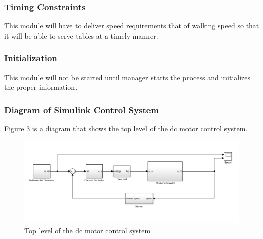 \documentclass [10pt]{article}
\begin{document}
\subsubsection{Timing Constraints}
This module will have to deliver speed requirements that of walking speed so that it will be able to serve tables at a timely manner.


\subsubsection{Initialization}
This module will not be started until manager starts the process and initializes the proper information.


\subsubsection{Diagram of Simulink Control System}
Figure 3 is a diagram that shows the top level of the dc motor control system. 
\begin{figure} [h!]
	\centering
	\includegraphics [scale = 0.4] {Figures/Simulink.png}
	\caption{Top level of the dc motor control system}
\end{figure}

\end{document}
